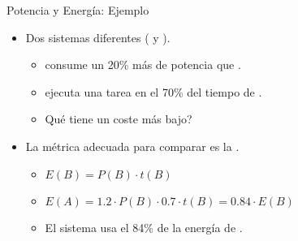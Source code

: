 \begin{frame}[t]{Potencia y Energía: Ejemplo}
\begin{itemize}
  \item Dos sistemas diferentes ( y ).
    \begin{itemize}
      \item {} consume un 20\% más de potencia que .
      \item {} ejecuta una tarea en el 70\% del tiempo de .
      \item Qué tiene un coste más bajo?
    \end{itemize}

  \item La métrica adecuada para comparar es la .
    \begin{itemize}
      \item $E(B) = P(B) \cdot t(B)$
      \item $E(A) = 1.2 \cdot P(B) \cdot 0.7 \cdot t(B) = 0.84 \cdot E(B)$
      \item El sistema  usa el 84\% de la energía de .
    \end{itemize}
\end{itemize}
\end{frame}

